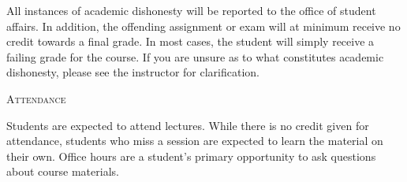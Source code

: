 \documentclass{letter}
\newcommand{\heading}[1]{{\large \textsc{#1}}}
\begin{document}
All instances of academic dishonesty will be reported to the office of student
affairs.  In addition, the offending assignment or exam will at minimum receive
no credit towards a final grade.  In most cases, the student will simply
receive a failing grade for the course.  If you are unsure as to what
constitutes academic dishonesty, please see the instructor for clarification.

\heading{Attendance}

Students are expected to attend lectures.  While there is no credit given for
attendance, students who miss a session are expected to learn the material on
their own.  Office hours are a student's primary opportunity to ask questions
about course materials.
\end{document}

